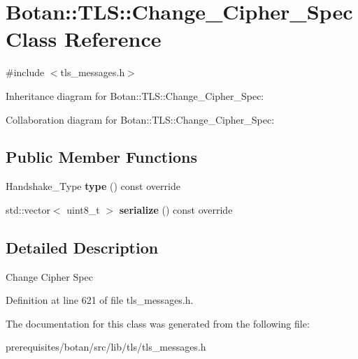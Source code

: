 \hypertarget{class_botan_1_1_t_l_s_1_1_change___cipher___spec}{}\section{Botan\+:\+:T\+LS\+:\+:Change\+\_\+\+Cipher\+\_\+\+Spec Class Reference}
\label{class_botan_1_1_t_l_s_1_1_change___cipher___spec}


{\ttfamily \#include $<$tls\+\_\+messages.\+h$>$}



Inheritance diagram for Botan\+:\+:T\+LS\+:\+:Change\+\_\+\+Cipher\+\_\+\+Spec\+:


Collaboration diagram for Botan\+:\+:T\+LS\+:\+:Change\+\_\+\+Cipher\+\_\+\+Spec\+:
\subsection*{Public Member Functions}
\begin{DoxyCompactItemize}
\item 
\mbox{\label{class_botan_1_1_t_l_s_1_1_change___cipher___spec_adc7c2bb60f9217dd3091e436a4c3978b}} 
Handshake\+\_\+\+Type {\bfseries type} () const override
\item 
\mbox{\label{class_botan_1_1_t_l_s_1_1_change___cipher___spec_a4b54f74845a6863c73237c8efc1c338f}} 
std\+::vector$<$ uint8\+\_\+t $>$ {\bfseries serialize} () const override
\end{DoxyCompactItemize}


\subsection{Detailed Description}
Change Cipher Spec 

Definition at line 621 of file tls\+\_\+messages.\+h.



The documentation for this class was generated from the following file\+:\begin{DoxyCompactItemize}
\item 
prerequisites/botan/src/lib/tls/tls\+\_\+messages.\+h\end{DoxyCompactItemize}
